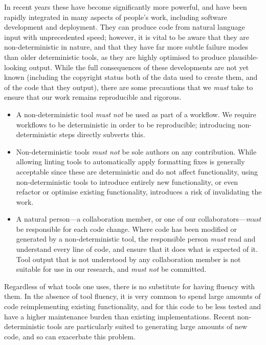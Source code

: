 \documentclass{article}
\newcommand\rfcword[1]{\emph{#1}\xspace}
\newcommand\must{\rfcword{must}}
\newcommand\mustnot{\rfcword{must not}}
\begin{document}
In recent years these have become significantly more powerful,
and have been rapidly integrated in many aspects of people's work,
including software development and deployment.
They can produce code from natural language input with unprecedented speed;
however,
it is vital to be aware that they are non-deterministic in nature,
and that they have far more subtle failure modes than older deterministic tools,
as they are highly optimised to produce plausible-looking output.
While the full consequences of these developments are not yet known
(including the copyright status both of the data used to create them,
and of the code that they output),
there are some precautions that we \must take
to ensure that our work remains reproducible and rigorous.

\begin{itemize}
  \item
        A non-deterministic tool \mustnot be used as part of a workflow.
        We require workflows to be deterministic in order to be reproducible;
        introducing non-deterministic steps directly subverts this.
  \item
        Non-deterministic tools \mustnot be sole authors on any contribution.
        While allowing linting tools to automatically apply formatting fixes
        is generally acceptable
        since these are deterministic and do not affect functionality,
        using non-deterministic tools to introduce entirely new functionality,
        or even refactor or optimise existing functionality,
        introduces a risk of invalidating the work.
  \item
        A natural person---a collaboration member, or one of our collaborators---\must
        be responsible for each code change.
        Where code has been modified or generated by a non-deterministic tool,
        the responsible person \must read and understand every line of code,
        and ensure that it does what is expected of it.
        Tool output that is not understood by any collaboration member
        is not suitable for use in our research,
        and \mustnot be committed.
\end{itemize}

Regardless of what tools one uses,
there is no substitute for having fluency with them.
In the absence of tool fluency,
it is very common to spend large amounts of code reimplementing existing functionality,
and for this code to be less tested and have a higher maintenance burden
than existing implementations.
Recent non-deterministic tools
are particularly suited to generating large amounts of new code,
and so can exacerbate this problem.
\end{document}
